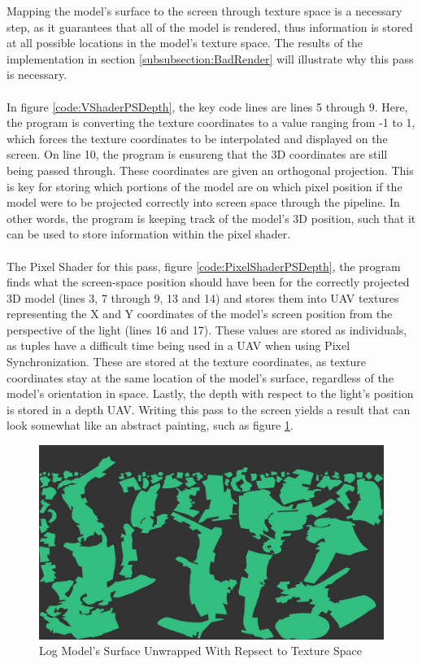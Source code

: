 \documentclass[a4paper, 12pt]{article}
\begin{document}
\noindent Mapping the model's surface to the screen through texture space is a
necessary step, as it guarantees that all of the model is rendered, thus
information is stored at all possible locations in the model's texture space.
The results of the implementation in section \ref{subsubsection:BadRender}
will illustrate why this pass is necessary. \\ \\ In figure
\ref{code:VShaderPSDepth}, the key code lines are lines 5 through 9. Here, the
program is converting the texture coordinates to a value ranging from -1 to 1,
which forces the texture coordinates to be interpolated and displayed on the
screen. On line 10, the program is ensureng that the 3D coordinates are still
being passed through. These coordinates are given an orthogonal projection.
This is key for storing which portions of the model are on which pixel
position if the model were to be projected correctly into screen space through
the pipeline. In other words, the program is keeping track of the model's 3D
position, such that it can be used to store information within the pixel
shader. \\ \\ The Pixel Shader for this pass, figure
\ref{code:PixelShaderPSDepth}, the program finds what the screen-space
position should have been for the correctly projected 3D model (lines 3, 7
through 9, 13 and 14) and stores them into UAV textures representing the X and
Y coordinates of the model's screen position from the perspective of the light
(lines 16 and 17). These values are stored as individuals, as tuples have a
difficult time being used in a UAV when using Pixel Synchronization. These are
stored at the texture coordinates, as texture coordinates stay at the same
location of the model's surface, regardless of the model's orientation in
space. Lastly, the depth with respect to the light's position is stored in a
depth UAV. Writing this pass to the screen yields a result that can look
somewhat like an abstract painting, such as figure \ref{pic:logTSpace}.

\begin{figure}[h]
	\centering
	\includegraphics[width=1.0\textwidth]{logTSpace.jpg}
	\caption{Log Model's Surface Unwrapped With Repsect to Texture Space}
	\label{pic:logTSpace}
\end{figure}
\end{document}
